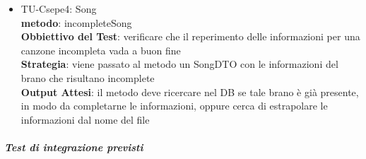 \begin{itemize}
\item TU-Csepe4: Song\\
\textbf{metodo}: incompleteSong\\
\textbf{Obbiettivo del Test}: verificare che il reperimento delle informazioni
per una canzone incompleta vada a buon fine\\
\textbf{Strategia}:
viene passato al metodo un SongDTO con le informazioni del brano che risultano
incomplete\\
\textbf{Output Attesi}: il metodo deve ricercare nel DB se tale brano \`e
gi\`a presente, in modo da completarne le informazioni, oppure cerca di
estrapolare le informazioni dal nome del file\\



\end{itemize}

\subparagraph{Test di integrazione previsti}

